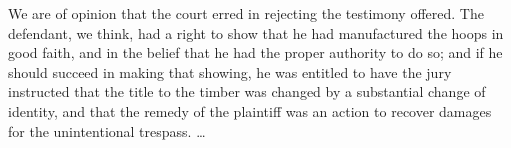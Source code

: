 We are of opinion that the court erred in rejecting the testimony offered. The
defendant, we think, had a right to show that he had manufactured the hoops in
good faith, and in the belief that he had the proper authority to do so; and if
he should succeed in making that showing, he was entitled to have the jury
instructed that the title to the timber was changed by a substantial change of
identity, and that the remedy of the plaintiff was an action to recover damages
for the unintentional trespass. \ldots

